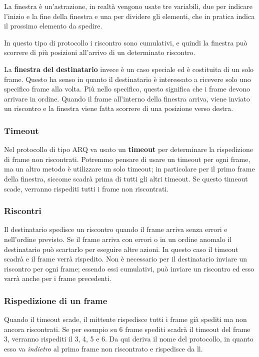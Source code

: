             La finestra è un'astrazione, in realtà vengono usate tre variabili, due per indicare l'inizio e la fine della finestra e una per dividere gli elementi, che in pratica indica il prossimo elemento da spedire.
            
            In questo tipo di protocollo i riscontro sono cumulativi, e quindi la finestra può scorrere di più posizioni all'arrivo di un determinato riscontro.
            
            La \textbf{finestra del destinatario} invece è un caso speciale ed è costituita di un solo frame. Questo ha senso in quanto il destinatario è interessato a ricevere solo uno specifico frame alla volta. Più nello specifico, questo significa che i frame devono arrivare in ordine. Quando il frame all'interno della finestra arriva, viene inviato un riscontro e la finestra viene fatta scorrere di una posizione verso destra.
            
        \subsubsection{Timeout}
            Nel protocollo di tipo ARQ va usato un \textbf{timeout} per determinare la rispedizione di frame non riscontrati. Potremmo pensare di usare un timeout per ogni frame, ma un altro metodo è utilizzare un solo timeout; in particolare per il primo frame della finestra, siccome scadrà prima di tutti gli altri timeout. Se questo timeout scade, verranno rispediti tutti i frame non riscontrati.
            
        \subsubsection{Riscontri}
            Il destinatario spedisce un riscontro quando il frame arriva senza errori e nell'ordine previsto. Se il frame arriva con errori o in un ordine anomalo il destinatario può scartarlo per eseguire altre azioni. In questo caso il timeout scadrà e il frame verrà rispedito. Non è necessario per il destinatario inviare un riscontro per ogni frame; essendo essi cumulativi, può inviare un riscontro ed esso varrà anche per i frame precedenti.
            
        \subsubsection{Rispedizione di un frame}
            Quando il timeout scade, il mittente rispedisce tutti i frame già spediti ma non ancora riscontrati. Se per esempio su 6 frame spediti scadrà il timeout del frame 3, verranno rispediti il 3, 4, 5 e 6. Da qui deriva il nome del protocollo, in quanto esso va \textit{indietro} al primo frame non riscontrato e rispedisce da lì.
            
